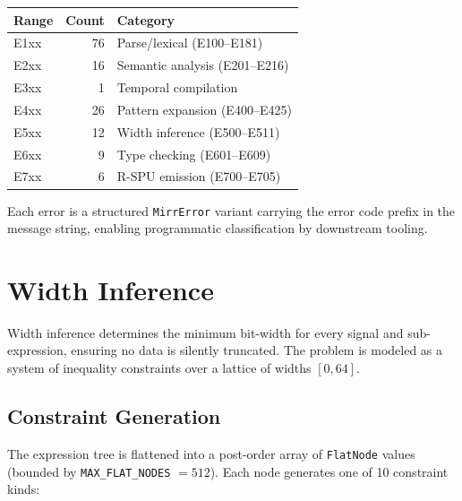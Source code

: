 \documentclass[conference]{IEEEtran}
\begin{document}
\begin{center}
\footnotesize
\begin{tabular}{@{}lrl@{}}
\toprule
\textbf{Range} & \textbf{Count} & \textbf{Category} \\
\midrule
E1xx & 76 & Parse/lexical (E100--E181) \\
E2xx & 16 & Semantic analysis (E201--E216) \\
E3xx &  1 & Temporal compilation \\
E4xx & 26 & Pattern expansion (E400--E425) \\
E5xx & 12 & Width inference (E500--E511) \\
E6xx &  9 & Type checking (E601--E609) \\
E7xx &  6 & R-SPU emission (E700--E705) \\
\bottomrule
\end{tabular}
\end{center}

Each error is a structured \texttt{MirrError} variant carrying the
error code prefix in the message string, enabling programmatic
classification by downstream tooling.

\section{Width Inference}\label{sec:width}

Width inference determines the minimum bit-width for every signal and
sub-expression, ensuring no data is silently truncated.  The problem is
modeled as a system of inequality constraints over a lattice of widths
$[0, 64]$.

\subsection{Constraint Generation}

The expression tree is flattened into a post-order array of
\texttt{FlatNode} values (bounded by \texttt{MAX\_FLAT\_NODES} $= 512$).
Each node generates one of 10 constraint kinds:
\end{document}
